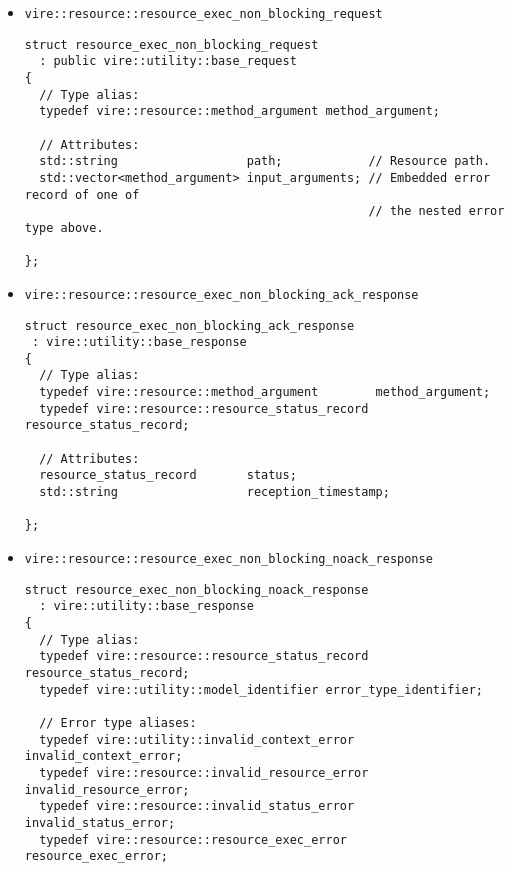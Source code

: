 \begin{itemize}

\item \texttt{vire::resource::resource\_exec\_non\_blocking\_request}
\small
\begin{Verbatim}[frame=single,xleftmargin=0.cm,label=\fbox{C++}]
struct resource_exec_non_blocking_request
  : public vire::utility::base_request
{
  // Type alias:
  typedef vire::resource::method_argument method_argument;

  // Attributes:
  std::string                  path;            // Resource path.
  std::vector<method_argument> input_arguments; // Embedded error record of one of
                                                // the nested error type above.

};
\end{Verbatim}

\item \texttt{vire::resource::resource\_exec\_non\_blocking\_ack\_response}


\small
\begin{Verbatim}[frame=single,xleftmargin=0.cm,label=\fbox{C++}]
struct resource_exec_non_blocking_ack_response
 : vire::utility::base_response
{
  // Type alias:
  typedef vire::resource::method_argument        method_argument;
  typedef vire::resource::resource_status_record resource_status_record;

  // Attributes:
  resource_status_record       status;
  std::string                  reception_timestamp;

};
\end{Verbatim}


\item \texttt{vire::resource::resource\_exec\_non\_blocking\_noack\_response}


\small
\begin{Verbatim}[frame=single,xleftmargin=0.cm,label=\fbox{C++}]
struct resource_exec_non_blocking_noack_response
  : vire::utility::base_response
{
  // Type alias:
  typedef vire::resource::resource_status_record resource_status_record;
  typedef vire::utility::model_identifier error_type_identifier;

  // Error type aliases:
  typedef vire::utility::invalid_context_error   invalid_context_error;
  typedef vire::resource::invalid_resource_error invalid_resource_error;
  typedef vire::resource::invalid_status_error   invalid_status_error;
  typedef vire::resource::resource_exec_error    resource_exec_error;


\end{Verbatim}
\end{itemize}
